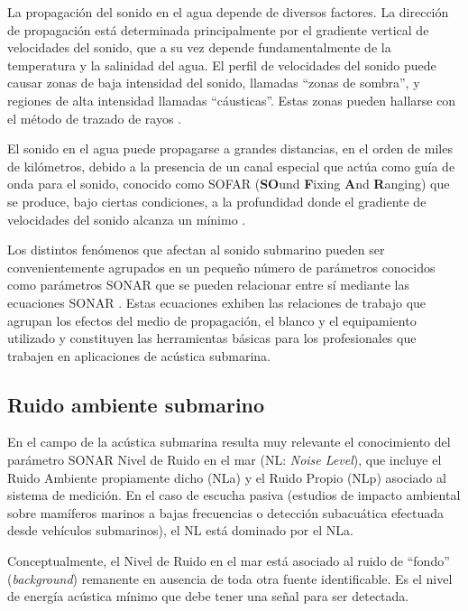La propagación del sonido en el agua depende de diversos factores.  La dirección de propagación está determinada principalmente por el gradiente vertical de velocidades del sonido, que a su vez depende fundamentalmente de la temperatura y la salinidad del agua.  El perfil de velocidades del sonido puede causar zonas de baja intensidad del sonido, llamadas ``zonas de sombra'', y regiones de alta intensidad llamadas ``cáusticas''. Estas zonas pueden hallarse con el método de trazado de rayos \citep{tappert1977parabolic}.

El sonido en el agua puede propagarse a grandes distancias, en el orden de miles de kilómetros, debido a la presencia de un canal especial que actúa como guía de onda para el sonido, conocido como SOFAR (\textbf{SO}und \textbf{F}ixing \textbf{A}nd \textbf{R}anging) que se produce, bajo ciertas condiciones, a la profundidad donde el gradiente de velocidades del sonido alcanza un mínimo \citep{medwin1997fundamentals}. 

Los distintos fenómenos que afectan al sonido submarino pueden ser convenientemente agrupados en un pequeño número de parámetros conocidos como parámetros SONAR que se pueden relacionar entre sí mediante las ecuaciones SONAR \citep{urick1975principles}.  Estas ecuaciones exhiben las relaciones de trabajo que agrupan los efectos del medio de propagación, el blanco y el equipamiento utilizado y constituyen las herramientas básicas para los profesionales que trabajen en aplicaciones de acústica submarina. 

\subsection{Ruido ambiente submarino}
\label{subsec:ruido}

En el campo de la acústica submarina resulta muy relevante el conocimiento del parámetro SONAR Nivel de Ruido en el mar (NL: \textit{Noise Level}), que incluye el Ruido Ambiente propiamente dicho (NLa) y el Ruido Propio (NLp) asociado al sistema de medición. En el caso de escucha pasiva (estudios de impacto ambiental sobre mamíferos marinos a bajas frecuencias o detección subacuática efectuada desde vehículos submarinos), el NL está dominado por el NLa.

Conceptualmente, el Nivel de Ruido en el mar está asociado al ruido de ``fondo'' (\textit{background}) remanente en ausencia de toda otra fuente identificable. Es el nivel de energía acústica mínimo que debe tener una señal para ser detectada.

